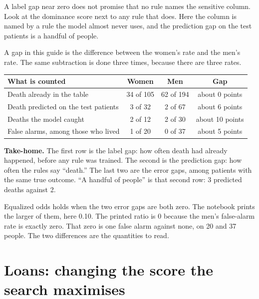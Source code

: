 \documentclass[11pt]{article}
\begin{document}
\begin{lesson}
A label gap near zero does not promise that no rule names the sensitive column. Look at the dominance score next to any rule that does. Here the column is named by a rule the model almost never uses, and the prediction gap on the test patients is a handful of people.
\end{lesson}

A gap in this guide is the difference between the women's rate and the men's rate. The same subtraction is done three times, because there are three rates.

\begin{table}[H]
\centering
\small
\begin{tabularx}{\textwidth}{@{}Y c c c@{}}
\toprule
What is counted & Women & Men & Gap \\
\midrule
Death already in the table & 34 of 105 & 62 of 194 & about 0 points \\
Death predicted on the test patients & 3 of 32 & 2 of 67 & about 6 points \\
Deaths the model caught & 2 of 12 & 2 of 30 & about 10 points \\
False alarms, among those who lived & 1 of 20 & 0 of 37 & about 5 points \\
\bottomrule
\end{tabularx}
\end{table}

\begin{plainwords}
\textbf{Take-home.} The first row is the label gap: how often death had already happened, before any rule was trained. The second is the prediction gap: how often the rules say ``death.'' The last two are the error gaps, among patients with the same true outcome. ``A handful of people'' is that second row: 3 predicted deaths against 2.

Equalized odds holds when the two error gaps are both zero. The notebook prints the larger of them, here 0.10. The printed ratio is 0 because the men's false-alarm rate is exactly zero. That zero is one false alarm against none, on 20 and 37 people. The two differences are the quantities to read.
\end{plainwords}

\section{Loans: changing the score the search maximises}
\label{sec:loans}
\end{document}
